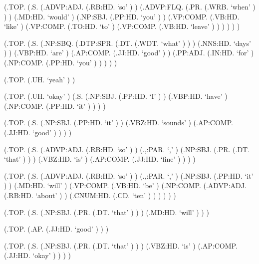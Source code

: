\documentclass[10pt]{article}
\begin{document}
\begin{parsetree}  (.TOP. (.S. (.ADVP:ADJ. (.RB:HD. `so' ) ) (.ADVP:FLQ. (.PR. (.WRB. `when' ) ) ) (.MD:HD. `would' ) (.NP:SBJ. (.PP:HD. `you' ) ) (.VP:COMP. (.VB:HD. `like' ) (.VP:COMP. (.TO:HD. `to' ) (.VP:COMP. (.VB:HD. `leave' ) ) ) ) ) ) \end{parsetree}

\begin{parsetree}  (.TOP. (.S. (.NP:SBQ. (.DTP:SPR. (.DT. (.WDT. `what' ) ) ) (.NNS:HD. `days' ) ) (.VBP:HD. `are' ) (.AP:COMP. (.JJ:HD. `good' ) ) (.PP:ADJ. (.IN:HD. `for' ) (.NP:COMP. (.PP:HD. `you' ) ) ) ) ) \end{parsetree}

\begin{parsetree}  (.TOP. (.UH. `yeah' ) ) \end{parsetree}

\begin{parsetree}  (.TOP. (.UH. `okay' ) (.S. (.NP:SBJ. (.PP:HD. `I' ) ) (.VBP:HD. `have' ) (.NP:COMP. (.PP:HD. `it' ) ) ) ) \end{parsetree}

\begin{parsetree}  (.TOP. (.S. (.NP:SBJ. (.PP:HD. `it' ) ) (.VBZ:HD. `sounds' ) (.AP:COMP. (.JJ:HD. `good' ) ) ) ) \end{parsetree}

\begin{parsetree}  (.TOP. (.S. (.ADVP:ADJ. (.RB:HD. `so' ) ) (.,:PAR. `,' ) (.NP:SBJ. (.PR. (.DT. `that' ) ) ) (.VBZ:HD. `is' ) (.AP:COMP. (.JJ:HD. `fine' ) ) ) ) \end{parsetree}

\begin{parsetree}  (.TOP. (.S. (.ADVP:ADJ. (.RB:HD. `so' ) ) (.,:PAR. `,' ) (.NP:SBJ. (.PP:HD. `it' ) ) (.MD:HD. `will' ) (.VP:COMP. (.VB:HD. `be' ) (.NP:COMP. (.ADVP:ADJ. (.RB:HD. `about' ) ) (.CNUM:HD. (.CD. `ten' ) ) ) ) ) ) \end{parsetree}

\begin{parsetree}  (.TOP. (.S. (.NP:SBJ. (.PR. (.DT. `that' ) ) ) (.MD:HD. `will' ) ) ) \end{parsetree}

\begin{parsetree}  (.TOP. (.AP. (.JJ:HD. `good' ) ) ) \end{parsetree}

\begin{parsetree}  (.TOP. (.S. (.NP:SBJ. (.PR. (.DT. `that' ) ) ) (.VBZ:HD. `is' ) (.AP:COMP. (.JJ:HD. `okay' ) ) ) ) \end{parsetree}
\end{document}
